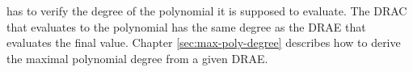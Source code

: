 \label{sec:checking-poly-degree}

\JWpTwo{} has to verify the degree of the polynomial it is supposed to evaluate.
The DRAC that evaluates to the polynomial has the same degree as the DRAE that
evaluates the final value. Chapter \ref{sec:max-poly-degree} describes how
to derive the maximal polynomial degree from a given DRAE\@.

